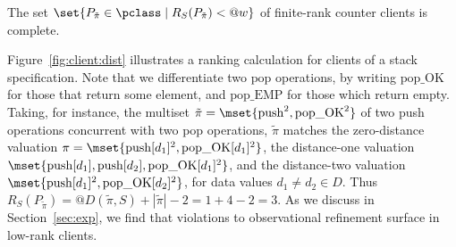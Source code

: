 \vspace{-1eX}
\begin{lemma}
  The set $\set{ P_{\tilde\pi} \in \pclass \mid R_S(P_{\tilde\pi}) < @w }$ of
  finite-rank counter clients is complete.
  \vspace{-1eX}
\end{lemma}

Figure~\ref{fig:client:dist} illustrates a ranking calculation for clients of a
stack specification. Note that we differentiate two $\mathrm{pop}$ operations,
by writing $\mathrm{pop\_OK}$ for those that return some element, and
$\mathrm{pop\_EMP}$ for those which return empty. Taking, for instance, the
multiset $\tilde\pi = \mset{ \mathrm{push}^2, \mathrm{pop\_OK}^2 }$ of two push
operations concurrent with two pop operations, $\tilde\pi$ matches
the zero-distance valuation $\pi = \mset{ \mathrm{push}[d_1]^2,
\mathrm{pop\_OK}[d_1]^2 }$, the distance-one valuation $\mset{
\mathrm{push}[d_1], \mathrm{push}[d_2], \mathrm{pop\_OK}[d_1]^2 }$, and the
distance-two valuation $\mset{ \mathrm{push}[d_1]^2, \mathrm{pop\_OK}[d_2]^2}$,
for data values $d_1 \neq d_2 \in D$. Thus $R_S(P_{\tilde\pi}) =
@D(\tilde\pi,S) + |\tilde\pi| - 2 = 1 + 4 - 2 = 3$. As we discuss in
Section~\ref{sec:exp}, we find that violations to observational refinement
surface in low-rank clients.


